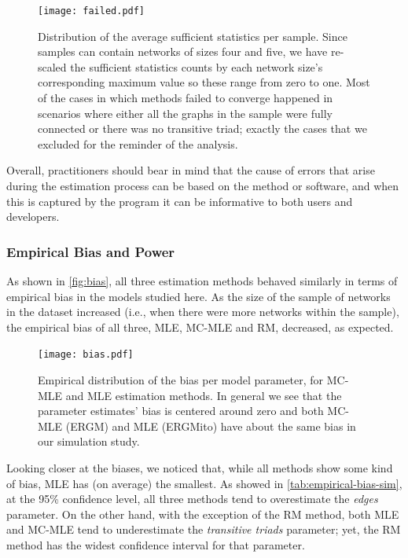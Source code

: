 \documentclass[review, nonatbib,doubleblind]{elsarticle/elsarticle}
\begin{document}
\begin{figure}[htb]
 	\centering
 	\caption{\label{fig:failed}Distribution of the average sufficient statistics per sample. Since samples can contain networks of sizes four and five, we have re-scaled the sufficient statistics counts by each network size's corresponding maximum value so these range from zero to one. Most of the cases in which methods failed to converge happened in scenarios where either all the graphs in the sample were fully connected or there was no transitive triad; exactly the cases that we excluded for the reminder of the analysis.}
 	\texttt{[image: failed.pdf]}
\end{figure}

Overall, practitioners should bear in mind that the cause of errors that arise during the estimation process can be based on the method or software, and when this is captured by the program it can be informative to both users and developers.  

\subsubsection{Empirical Bias and Power}

As shown in \autoref{fig:bias}, all three estimation methods behaved similarly in terms of empirical bias in the models studied here. As the size of the sample of networks in the dataset increased (i.e., when there were more networks within the sample), the empirical bias of all three, MLE, MC-MLE and RM, decreased, as expected.

\begin{figure}[htb]
	\centering
	\caption{\label{fig:bias}Empirical distribution of the bias per model parameter, for MC-MLE and MLE estimation methods. In general we see that the parameter estimates' bias is centered around zero and both MC-MLE (ERGM) and MLE (ERGMito) have about the same bias in our simulation study.}
	\texttt{[image: bias.pdf]}
\end{figure}
    
Looking closer at the biases, we noticed that, while all methods show some kind of bias, MLE has (on average) the smallest. As showed in \autoref{tab:empirical-bias-sim}, at the 95\% confidence level, all three methods tend to overestimate the \textit{edges} parameter. On the other hand, with the exception of the RM method, both MLE and MC-MLE tend to underestimate the \textit{transitive triads} parameter; yet, the RM method has the widest confidence interval for that parameter.
\end{document}
